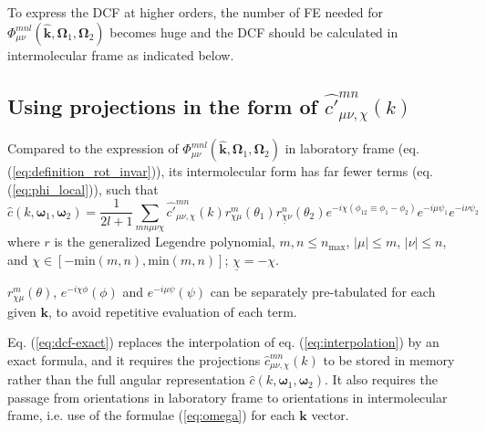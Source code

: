 To express the \acs{DCF} at higher orders, the number of \acs{FE}
needed for $\Phi_{\mu\nu}^{mnl}(\mathbf{\hat{k}},\mathbf{\Omega}_{1},\mathbf{\Omega}_{2})$
becomes huge and the \acs{DCF} should be calculated in intermolecular
frame as indicated below.

\subsection{Using projections in the form of $\hat{c'}_{\mu\nu,\chi}^{mn}(k)$\label{subsec:Using-projections-in-1}}

Compared to the expression of $\Phi_{\mu\nu}^{mnl}(\mathbf{\hat{k}},\mathbf{\Omega}_{1},\mathbf{\Omega}_{2})$
in laboratory frame (eq. (\ref{eq:definition_rot_invar})), its intermolecular
form has far fewer terms (eq. (\ref{eq:phi_local})), such that
\begin{equation}
\hat{c}(k,\boldsymbol{\omega}_{1},\boldsymbol{\omega}_{2})=\frac{1}{2l+1}\sum_{mn\mu\nu\chi}\hat{c'}_{\mu\nu,\chi}^{mn}(k)r_{\chi\mu}^{m}(\theta_{1})r_{\underline{\chi}\nu}^{n}(\theta_{2})e^{-i\chi(\phi_{12}\equiv\phi_{1}-\phi_{2})}e^{-i\mu\psi_{1}}e^{-i\nu\psi_{2}}\label{eq:dcf-exact}
\end{equation}
where $r$ is the generalized Legendre polynomial, $m,n\leq n{}_{\mathrm{max}}$,
$\left|\mu\right|\leq m$, $\left|\nu\right|\leq n$, and $\chi\in\left[-\mathrm{min}(m,n),\mathrm{min}(m,n)\right]$;
$\underline{\chi}=-\chi$.

$r_{\chi\mu}^{m}(\theta)$, $e^{-i\chi\phi}(\phi)$ and $e^{-i\mu\psi}(\psi)$
can be separately pre-tabulated for each given $\mathbf{k}$, to avoid
repetitive evaluation of each term.

Eq. (\ref{eq:dcf-exact}) replaces the interpolation of eq. (\ref{eq:interpolation})
by an exact formula, and it requires the projections $\hat{c}_{\mu\nu,\chi}^{mn}(k)$
to be stored in memory rather than the full angular representation
$\hat{c}(k,\boldsymbol{\omega}_{1},\boldsymbol{\omega}_{2})$. It
also requires the passage from orientations in laboratory frame to
orientations in intermolecular frame, i.e. use of the formulae (\ref{eq:omega})
for each $\mathbf{k}$ vector.
